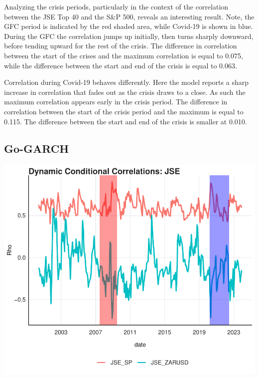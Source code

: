\documentclass[11pt,preprint, authoryear]{elsarticle}
\let\origfigure\figure
\let\endorigfigure\endfigure
\renewenvironment{figure}[1][2] {
    \expandafter\origfigure\expandafter[H]
} {
    \endorigfigure
}
\numberwithin{equation}{section}
\numberwithin{figure}{section}
\numberwithin{table}{section}
\begin{document}
Analyzing the crisis periods, particularly in the context of the
correlation between the JSE Top 40 and the S\&P 500, reveals an
interesting result. Note, the GFC period is indicated by the red shaded
area, while Covid-19 is shown in blue. During the GFC the correlation
jumps up initially, then turns sharply downward, before tending upward
for the rest of the crisis. The difference in correlation between the
start of the crises and the maximum correlation is equal to 0.075, while
the difference between the start and end of the crisis is equal to
0.063.

Correlation during Covid-19 behaves differently. Here the model reports
a sharp increase in correlation that fades out as the crisis draws to a
close. As such the maximum correlation appears early in the crisis
period. The difference in correlation between the start of the crisis
period and the maximum is equal to 0.115. The difference between the
start and end of the crisis is smaller at 0.010.

\hypertarget{go-garch-1}{%
\subsection{Go-GARCH}\label{go-garch-1}}

\begin{figure}[H]

{\centering \includegraphics{FormalWriteUp_files/figure-latex/Figure5-1} 

}

\caption{GO-GARCH \label{Figure5}}\label{fig:Figure5}
\end{figure}
\end{document}
